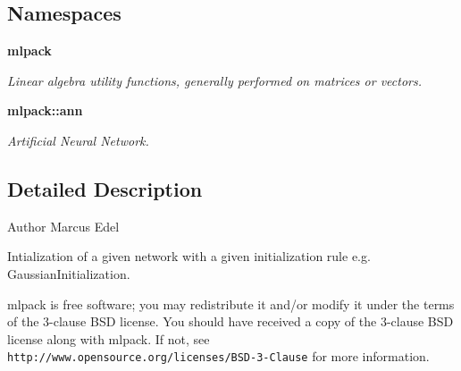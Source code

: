 \subsection*{Namespaces}
\begin{DoxyCompactItemize}
\item 
 \textbf{ mlpack}
\begin{DoxyCompactList}\small\item\em Linear algebra utility functions, generally performed on matrices or vectors. \end{DoxyCompactList}\item 
 \textbf{ mlpack\+::ann}
\begin{DoxyCompactList}\small\item\em Artificial Neural Network. \end{DoxyCompactList}\end{DoxyCompactItemize}


\subsection{Detailed Description}
\begin{DoxyAuthor}{Author}
Marcus Edel
\end{DoxyAuthor}
Intialization of a given network with a given initialization rule e.\+g. Gaussian\+Initialization.

mlpack is free software; you may redistribute it and/or modify it under the terms of the 3-\/clause B\+SD license. You should have received a copy of the 3-\/clause B\+SD license along with mlpack. If not, see {\tt http\+://www.\+opensource.\+org/licenses/\+B\+S\+D-\/3-\/\+Clause} for more information. 